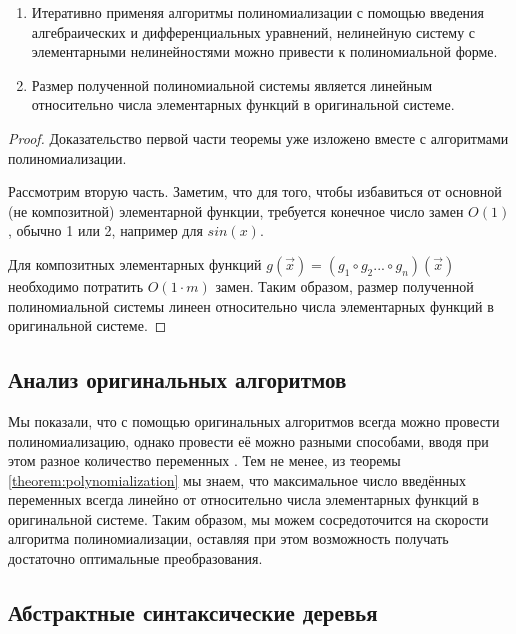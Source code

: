 \begin{theorem} \label{theorem:polynomialization}
    \begin{enumerate}
    \item Итеративно применяя алгоритмы полиномиализации с помощью введения алгебраических и дифференциальных уравнений, нелинейную систему с элементарными нелинейностями можно привести к полиномиальной форме.
    \item Размер полученной полиномиальной системы является линейным относительно числа элементарных функций в     оригинальной системе.
\end{enumerate}
\end{theorem}

\begin{proof}
    Доказательство первой части теоремы уже изложено вместе с алгоритмами полиномиализации.
    
    Рассмотрим вторую часть.
    Заметим, что для того, чтобы избавиться от основной (не композитной) элементарной функции,
    требуется конечное число замен $O(1)$, обычно 1 или 2, например для $sin(x)$.
    
    Для композитных элементарных функций $g(\vec x) = (g_1 \circ g_2 ... \circ g_n)(\vec x)$ необходимо потратить $O(1 \cdot m)$ замен.
    Таким образом, размер полученной полиномиальной системы линеен относительно числа элементарных функций в оригинальной системе.
\end{proof}

\subsection{Анализ оригинальных алгоритмов}

Мы показали, что с помощью оригинальных алгоритмов всегда можно провести полиномиализацию, однако провести её можно разными способами, вводя при этом разное количество переменных \cite{Gu-PhD}. Тем не менее, из теоремы \ref{theorem:polynomialization} мы знаем, что максимальное число введённых переменных всегда линейно от относительно числа элементарных функций в оригинальной системе. Таким образом, мы можем сосредоточится на скорости алгоритма полиномиализации, оставляя при этом возможность получать достаточно оптимальные преобразования.

\subsection{Абстрактные синтаксические деревья} \label{sec:AST}


